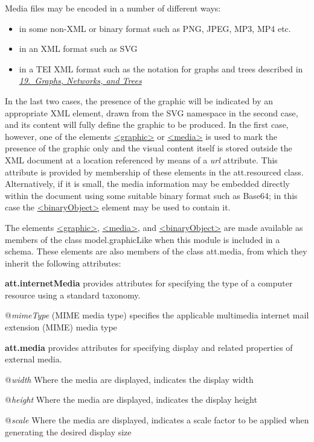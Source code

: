 Media files may be encoded in a number of different ways: \begin{itemize}
\item in some non-XML or binary format such as PNG, JPEG, MP3, MP4 etc.
\item in an XML format such as SVG
\item in a TEI XML format such as the notation for graphs and trees described in \textit{\hyperref[GD]{19.\ Graphs, Networks, and Trees}}
\end{itemize}  In the last two cases, the presence of the graphic will be indicated by an appropriate XML element, drawn from the SVG namespace in the second case, and its content will fully define the graphic to be produced. In the first case, however, one of the elements \hyperref[TEI.graphic]{<graphic>} or \hyperref[TEI.media]{<media>} is used to mark the presence of the graphic only and the visual content itself is stored outside the XML document at a location referenced by means of a {\itshape url} attribute. This attribute is provided by membership of these elements in the \textsf{att.resourced} class. Alternatively, if it is small, the media information may be embedded directly within the document using some suitable binary format such as Base64; in this case the \hyperref[TEI.binaryObject]{<binaryObject>} element may be used to contain it.\par
The elements \hyperref[TEI.graphic]{<graphic>}, \hyperref[TEI.media]{<media>}, and \hyperref[TEI.binaryObject]{<binaryObject>} are made available as members of the class \textsf{model.graphicLike} when this module is included in a schema. These elements are also members of the class \textsf{att.media}, from which they inherit the following attributes: 
\begin{sansreflist}
  
\item [\textbf{att.internetMedia}] provides attributes for specifying the type of a computer resource using a standard taxonomy.\hfil\\[-10pt]\begin{sansreflist}
    \item[@{\itshape mimeType}]
  (MIME media type) specifies the applicable multimedia internet mail extension (MIME) media type
\end{sansreflist}  
\item [\textbf{att.media}] provides attributes for specifying display and related properties of external media.\hfil\\[-10pt]\begin{sansreflist}
    \item[@{\itshape width}]
  Where the media are displayed, indicates the display width
    \item[@{\itshape height}]
  Where the media are displayed, indicates the display height
    \item[@{\itshape scale}]
  Where the media are displayed, indicates a scale factor to be applied when generating the desired display size
\end{sansreflist}  
\end{sansreflist}

